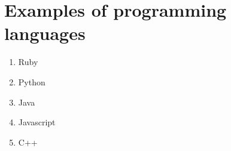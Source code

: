 \documentclass{article}
\begin{document}
\section{Examples of programming languages}
	
	\begin{enumerate}
		\item Ruby
		\item Python
		\item Java
		\item Javascript
		\item C++ 
	\end{enumerate}
\end{document}
